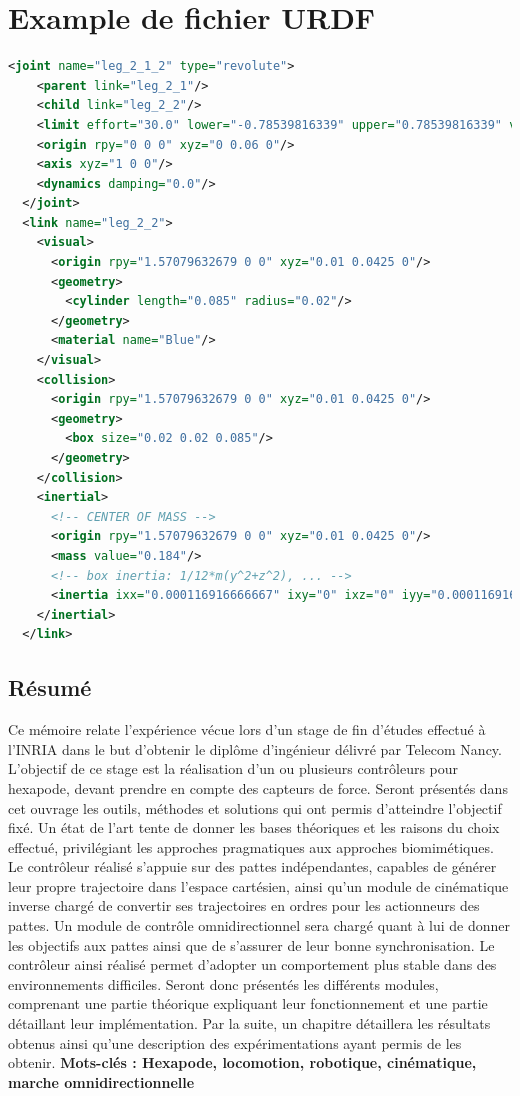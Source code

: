 \documentclass{tnreport}
\begin{document}
\chapter{Example de fichier URDF}\label{lb:urdf}
\begin{lstlisting}[language=xml,caption={Exemple de fichier URDF, ici une partie de la jambe de notre robot}, label={lst:exempleURDF}]
<joint name="leg_2_1_2" type="revolute">
    <parent link="leg_2_1"/>
    <child link="leg_2_2"/>
    <limit effort="30.0" lower="-0.78539816339" upper="0.78539816339" velocity="7.0"/>
    <origin rpy="0 0 0" xyz="0 0.06 0"/>
    <axis xyz="1 0 0"/>
    <dynamics damping="0.0"/>
  </joint>
  <link name="leg_2_2">
    <visual>
      <origin rpy="1.57079632679 0 0" xyz="0.01 0.0425 0"/>
      <geometry>
        <cylinder length="0.085" radius="0.02"/>
      </geometry>
      <material name="Blue"/>
    </visual>
    <collision>
      <origin rpy="1.57079632679 0 0" xyz="0.01 0.0425 0"/>
      <geometry>
        <box size="0.02 0.02 0.085"/>
      </geometry>
    </collision>
    <inertial>
      <!-- CENTER OF MASS -->
      <origin rpy="1.57079632679 0 0" xyz="0.01 0.0425 0"/>
      <mass value="0.184"/>
      <!-- box inertia: 1/12*m(y^2+z^2), ... -->
      <inertia ixx="0.000116916666667" ixy="0" ixz="0" iyy="0.000116916666667" iyz="0" izz="1.22666666667e-05"/>
    </inertial>
  </link>
\end{lstlisting}
\newpage
\section*{Résumé}
Ce mémoire relate l'expérience vécue lors d'un stage de fin d'études effectué à l'\gls{INRIA} dans le but d'obtenir le diplôme d'ingénieur délivré par Telecom Nancy. L'objectif de ce stage est la réalisation d'un ou plusieurs contrôleurs pour hexapode, devant prendre en compte des capteurs de force. Seront présentés dans cet ouvrage les outils, méthodes et solutions qui ont permis d'atteindre l'objectif fixé. Un état de l'art tente de donner les bases théoriques et les raisons du choix effectué, privilégiant les approches pragmatiques aux approches biomimétiques. Le contrôleur réalisé s'appuie sur des pattes indépendantes, capables de générer leur propre trajectoire dans l'espace cartésien, ainsi qu'un module de cinématique inverse chargé de convertir ses trajectoires en ordres pour les actionneurs des pattes. Un module de contrôle omnidirectionnel sera chargé quant à lui de donner les objectifs aux pattes ainsi que de s'assurer de leur bonne synchronisation. Le contrôleur ainsi réalisé permet d'adopter un comportement plus stable dans des environnements difficiles. Seront donc présentés les différents modules, comprenant une partie théorique expliquant leur fonctionnement et une partie détaillant leur implémentation. Par la suite, un chapitre détaillera les résultats obtenus ainsi qu'une description des expérimentations ayant permis de les obtenir.
{\bf Mots-clés : Hexapode, locomotion, robotique, cinématique, marche omnidirectionnelle}
\end{document}
